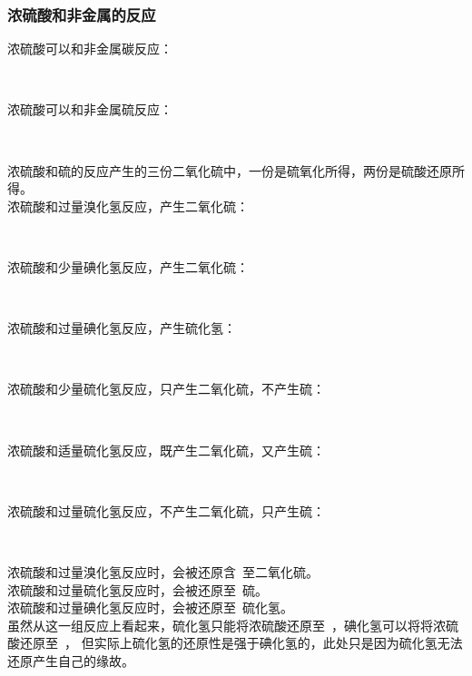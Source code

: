 \documentclass[UTF8]{ctexart}
\newcommand{\LiValence}[3]
{
    \overset{\texttt{\tiny #1}\text{\tiny #2}}{\ce{#3}}
}
\begin{document}
\newpage

\subsubsection{浓硫酸和非金属的反应}
    浓硫酸可以和非金属碳反应：
    \begin{center}
        \\[6mm]
    \end{center}
    浓硫酸可以和非金属硫反应：
    \begin{center}
        \\[6mm]
    \end{center}
    浓硫酸和硫的反应产生的三份二氧化硫中，一份是硫氧化所得，两份是硫酸还原所得。\\[12mm]
    浓硫酸和过量溴化氢反应，产生二氧化硫：
    \begin{center}
        ~\\[6mm]
    \end{center}
    浓硫酸和少量碘化氢反应，产生二氧化硫：
    \begin{center}
        ~\\[6mm]
    \end{center}
    浓硫酸和过量碘化氢反应，产生硫化氢：
    \begin{center}
        ~~\\[6mm]
    \end{center}
    浓硫酸和少量硫化氢反应，只产生二氧化硫，不产生硫：
    \begin{center}
        \\[6mm]
    \end{center}
    浓硫酸和适量硫化氢反应，既产生二氧化硫，又产生硫：
    \begin{center}
        \\[6mm]
    \end{center}
    浓硫酸和过量硫化氢反应，不产生二氧化硫，只产生硫：
    \begin{center}
        \\[6mm]
    \end{center}
    浓硫酸和过量溴化氢反应时，会被还原含~\ce{$\LiValence{+}{4}{S}$}至二氧化硫。\\[3mm]
    浓硫酸和过量硫化氢反应时，会被还原至~\ce{$\LiValence{}{0}{S}$}硫。\\[3mm]
    浓硫酸和过量碘化氢反应时，会被还原至~\ce{$\LiValence{-}{2}{S}$}硫化氢。\\[3mm]
    虽然从这一组反应上看起来，硫化氢只能将浓硫酸还原至~\ce{$\LiValence{}{0}{S}$}，碘化氢可以将将浓硫酸还原至~\ce{$\LiValence{-}{2}{S}$}，
    但实际上硫化氢的还原性是强于碘化氢的，此处只是因为硫化氢无法还原产生自己的缘故。
\end{document}
